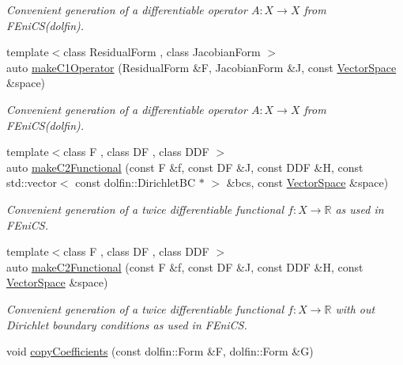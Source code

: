 \begin{DoxyCompactItemize}
\begin{DoxyCompactList}\small\item\em \-Convenient generation of a differentiable operator $A: X\rightarrow X$ from \-F\-Eni\-C\-S(dolfin). \end{DoxyCompactList}\item 
{\footnotesize template$<$class Residual\-Form , class Jacobian\-Form $>$ }\\auto \hyperlink{namespaceSpacy_1_1FEniCS_a327fc1d746fab9fbc5c703efe31de13a}{make\-C1\-Operator} (\-Residual\-Form \&\-F, \-Jacobian\-Form \&\-J, const \hyperlink{classSpacy_1_1VectorSpace}{\-Vector\-Space} \&space)
\begin{DoxyCompactList}\small\item\em \-Convenient generation of a differentiable operator $A: X\rightarrow X$ from \-F\-Eni\-C\-S(dolfin). \end{DoxyCompactList}\item 
{\footnotesize template$<$class F , class D\-F , class D\-D\-F $>$ }\\auto \hyperlink{namespaceSpacy_1_1FEniCS_a78db716003d17d5f781dfcb13a183519}{make\-C2\-Functional} (const \-F \&f, const \-D\-F \&\-J, const \-D\-D\-F \&\-H, const std\-::vector$<$ const dolfin\-::\-Dirichlet\-B\-C $\ast$ $>$ \&bcs, const \hyperlink{classSpacy_1_1VectorSpace}{\-Vector\-Space} \&space)
\begin{DoxyCompactList}\small\item\em \-Convenient generation of a twice differentiable functional $f: X\rightarrow \mathbb{R}$ as used in \-F\-Eni\-C\-S. \end{DoxyCompactList}\item 
{\footnotesize template$<$class F , class D\-F , class D\-D\-F $>$ }\\auto \hyperlink{namespaceSpacy_1_1FEniCS_a4e69e5b7265feac21653bfc2da725a75}{make\-C2\-Functional} (const \-F \&f, const \-D\-F \&\-J, const \-D\-D\-F \&\-H, const \hyperlink{classSpacy_1_1VectorSpace}{\-Vector\-Space} \&space)
\begin{DoxyCompactList}\small\item\em \-Convenient generation of a twice differentiable functional $f: X\rightarrow \mathbb{R}$ with out \-Dirichlet boundary conditions as used in \-F\-Eni\-C\-S. \end{DoxyCompactList}\item 
void \hyperlink{group__FenicsGroup_gab3d4c7c1e91a50e4e816598258b6edce}{copy\-Coefficients} (const dolfin\-::\-Form \&\-F, dolfin\-::\-Form \&\-G)

\end{DoxyCompactItemize}
